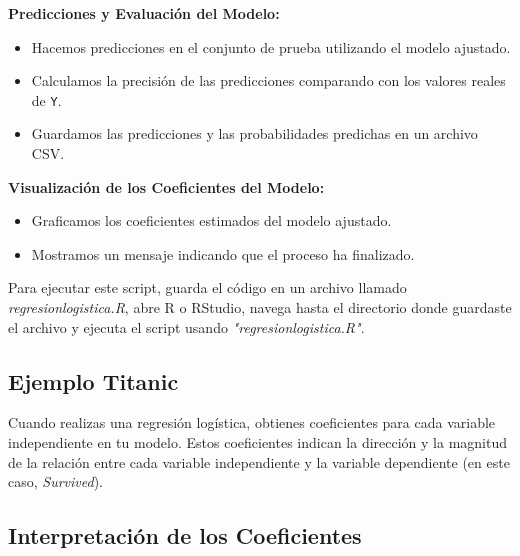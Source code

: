 \textbf{Predicciones y Evaluación del Modelo:}

\begin{itemize}
    \item Hacemos predicciones en el conjunto de prueba utilizando el modelo ajustado.
    \item Calculamos la precisión de las predicciones comparando con los valores reales de \texttt{Y}.
    \item Guardamos las predicciones y las probabilidades predichas en un archivo CSV.
\end{itemize}

\textbf{Visualización de los Coeficientes del Modelo:}

\begin{itemize}
    \item Graficamos los coeficientes estimados del modelo ajustado.
    \item Mostramos un mensaje indicando que el proceso ha finalizado.
\end{itemize}

Para ejecutar este script, guarda el código en un archivo llamado \textit{regresionlogistica.R}, abre R o RStudio, navega hasta el directorio donde guardaste el archivo y ejecuta el script usando \textit{"regresionlogistica.R"}.

\subsection*{Ejemplo Titanic}

Cuando realizas una regresión logística, obtienes coeficientes para cada variable independiente en tu modelo. Estos coeficientes indican la dirección y la magnitud de la relación entre cada variable independiente y la variable dependiente (en este caso, \textit{Survived}).

\subsection*{Interpretación de los Coeficientes}

